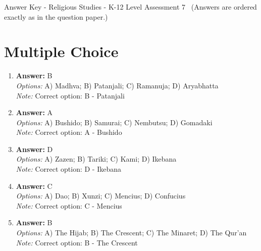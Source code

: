 \documentclass[12pt]{article}
\begin{document}
\begin{center}
Answer Key - Religious Studies - K-12 Level Assessment 7 \
\small (Answers are ordered exactly as in the question paper.)
\end{center}

\section*{Multiple Choice}
\begin{enumerate}[label=\arabic*.]
\item \textbf{Answer:} B
\\ \textit{Options:} A) Madhva; B) Patanjali; C) Ramanuja; D) Aryabhatta
\\ \textit{Note:} Correct option: B - Patanjali
\item \textbf{Answer:} A
\\ \textit{Options:} A) Bushido; B) Samurai; C) Nembutsu; D) Gomadaki
\\ \textit{Note:} Correct option: A - Bushido
\item \textbf{Answer:} D
\\ \textit{Options:} A) Zazen; B) Tariki; C) Kami; D) Ikebana
\\ \textit{Note:} Correct option: D - Ikebana
\item \textbf{Answer:} C
\\ \textit{Options:} A) Dao; B) Xunzi; C) Mencius; D) Confucius
\\ \textit{Note:} Correct option: C - Mencius
\item \textbf{Answer:} B
\\ \textit{Options:} A) The Hijab; B) The Crescent; C) The Minaret; D) The Qur'an
\\ \textit{Note:} Correct option: B - The Crescent
\end{enumerate}
\end{document}
